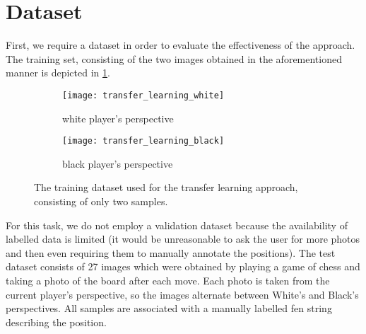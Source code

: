\documentclass[../report.tex]{subfiles}
\begin{document}
\section{Dataset}
First, we require a dataset in order to evaluate the effectiveness of the approach.
The training set, consisting of the two images obtained in the aforementioned manner is depicted in \cref{fig:transfer_learning_train_data}.
\begin{figure}
    \centering
    \begin{subfigure}[b]{0.47\textwidth}
        \centering
        \texttt{[image: transfer\_learning\_white]}
        \caption{white player's perspective}
    \end{subfigure}
    \hfill
    \begin{subfigure}[b]{0.47\textwidth}
        \centering
        \texttt{[image: transfer\_learning\_black]}
        \caption{black player's perspective}
    \end{subfigure}
    \caption{The training dataset used for the transfer learning approach, consisting of only two samples.}
    \label{fig:transfer_learning_train_data}
\end{figure}
For this task, we do not employ a validation dataset because the availability of labelled data is limited (it would be unreasonable to ask the user for more photos and then even requiring them to manually annotate the positions).
The test dataset consists of 27 images which were obtained by playing a game of chess and taking a photo of the board after each move.
Each photo is taken from the current player's perspective, so the images alternate between White's and Black's perspectives.
All samples are associated with a manually labelled \gls{fen} string describing the position.
\end{document}

